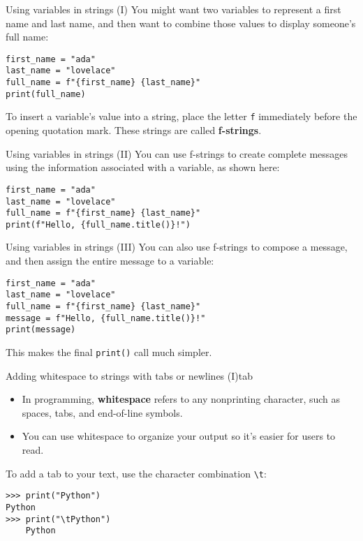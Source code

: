 \documentclass[aspectratio=169]{beamer}
\begin{document}
\begin{frame}[fragile]{Using variables in strings (I)}
    You might want two variables to represent a first name and last name, and then want to combine those values to display someone's full name:
    \vspace{10pt}
    \begin{Verbatim}
first_name = "ada"
last_name = "lovelace"
full_name = f"{first_name} {last_name}"
print(full_name)
    \end{Verbatim}
    \vspace{25pt}
    To insert a variable's value into a string, place the letter \texttt{f} immediately before the opening quotation mark.
    These strings are called \textbf{f-strings}.
\end{frame}


\begin{frame}[fragile]{Using variables in strings (II)}
    You can use f-strings to create complete messages using the information associated with a variable, as shown here:
    \vspace{10pt}
    \begin{Verbatim}
first_name = "ada"
last_name = "lovelace"
full_name = f"{first_name} {last_name}"
print(f"Hello, {full_name.title()}!")
    \end{Verbatim}
\end{frame}


\begin{frame}[fragile]{Using variables in strings (III)}
    You can also use f-strings to compose a message, and then assign the entire message to a variable:
    \vspace{10pt}
    \begin{Verbatim}
first_name = "ada"
last_name = "lovelace"
full_name = f"{first_name} {last_name}"
message = f"Hello, {full_name.title()}!"
print(message)
    \end{Verbatim}
    \vspace{25pt}
    This makes the final \texttt{print()} call much simpler.
\end{frame}


\begin{frame}[fragile]{Adding whitespace to strings with tabs or newlines (I)}{tab}
    \begin{itemize}[label=--]
        \item In programming, \textbf{whitespace} refers to any nonprinting character, such as spaces, tabs, and end-of-line symbols.
        \item You can use whitespace to organize your output so it's easier for users to read.
    \end{itemize}
    \vspace{15pt}
    To add a tab  to your text, use the character combination \verb|\t|:
    \vspace{10pt}
    \begin{Verbatim}
>>> print("Python")
Python
>>> print("\tPython")
    Python
    \end{Verbatim}
\end{frame}
\end{document}
